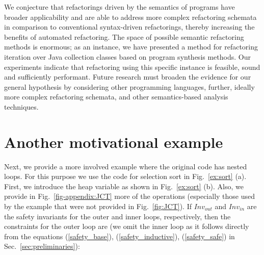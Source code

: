 \documentclass[runningheads,a4paper]{llncs}
\begin{document}
We conjecture that refactorings driven by the semantics of programs have
broader applicability and are able to address more complex refactoring
schemata in comparison to conventional syntax-driven refactorings, thereby
increasing the benefits of automated refactoring.  The space of possible
semantic refactoring methods is enormous; as an instance, we have presented
a method for refactoring iteration over Java collection classes based on
program synthesis methods.  Our experiments indicate that refactoring using
this specific instance is feasible, sound and sufficiently performant. 
Future research must broaden the evidence for our general hypothesis by
considering other programming languages, further, ideally more complex
refactoring schemata, and other semantics-based analysis techniques.




{}





\appendix

\section{Another motivational example}
%
Next, we provide a more involved example where the original code has nested
loops.  For this purpose we use the code for selection sort in
Fig.~\ref{ex:sort} (a).  First, we introduce the heap variable as shown in
Fig.~\ref{ex:sort} (b).
Also, we provide in Fig.~\ref{fig-appendix:JCT} more of the \logic operations
(especially those used by the example that were not provided in Fig.~\ref{fig:JCT}).
If $\mathit{Inv}_\mathit{out}$ and
$\mathit{Inv}_\mathit{in}$ are the safety invariants for the outer and inner
loops, respectively, then the constraints for the outer loop are
(we omit the inner loop as it follows directly from the equations
(\ref{safety_base}), (\ref{safety_inductive}), (\ref{safety_safe}) in
Sec.~\ref{sec:preliminaries}):
\end{document}
